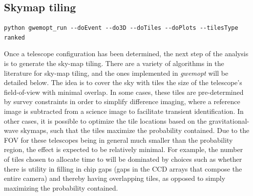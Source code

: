 \documentclass[twocolumn]{aastex62}
\begin{document}
\subsection{Skymap tiling}
\label{subsection:tiling}
\begin{lstlisting}
python gwemopt_run --doEvent --do3D --doTiles --doPlots --tilesType ranked
\end{lstlisting}
Once a telescope configuration has been determined, the next step of the analysis is to generate the sky-map tiling.
There are a variety of algorithms in the literature for sky-map tiling, and the ones implemented in \emph{gwemopt} will be detailed below. The idea is to cover the sky with tiles the size of the telescope's field-of-view with minimal overlap. In some cases, these tiles are pre-determined by survey constraints in order to simplify difference imaging, where a reference image is subtracted from a science image to facilitate transient identification. In other cases, it is possible to optimize the tile locations based on the gravitational-wave skymaps, such that the tiles maximize the probability contained. Due to the FOV for these telescopes being in general much smaller than the probability region, the effect is expected to be relatively minimal.
For example, the number of tiles chosen to allocate time to will be dominated by choices such as whether there is utility in filling in chip gaps (gaps in the CCD arrays that compose the entire camera) and thereby having overlapping tiles, as opposed to simply maximizing the probability contained.
\end{document}
